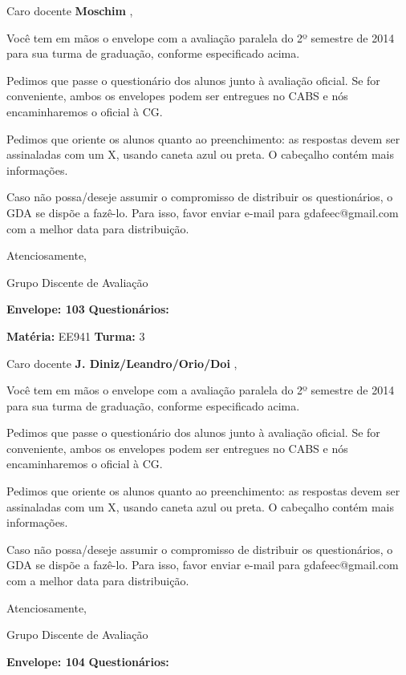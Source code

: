 \documentclass[a5paper]{letter}
\begin{document}
Caro docente {\bf Moschim }, 

	Você tem em mãos o envelope com a avaliação paralela do 2º semestre de 2014 para sua turma de graduação, conforme especificado acima.

	Pedimos que passe o questionário dos alunos junto à avaliação oficial. Se for conveniente, ambos os envelopes podem ser entregues no CABS e nós encaminharemos o oficial à CG.

Pedimos que oriente os alunos quanto ao preenchimento: as respostas devem ser assinaladas com um X, usando caneta azul ou preta. O cabeçalho contém mais informações.

	Caso não possa/deseje assumir o compromisso de distribuir os questionários, o GDA se dispõe a fazê-lo. Para isso, favor enviar e-mail para gdafeec@gmail.com com a melhor data para distribuição.


Atenciosamente, 

Grupo Discente de Avaliação

\vspace{0.5cm}

{\bf Envelope: 103 }		\hfill	{\bf Questionários:} \hspace{2cm}

\newpage
\thispagestyle{empty}

\hfill {\bf Matéria:} EE941 {\bf Turma:} 3

Caro docente {\bf J. Diniz/Leandro/Orio/Doi }, 

	Você tem em mãos o envelope com a avaliação paralela do 2º semestre de 2014 para sua turma de graduação, conforme especificado acima.

	Pedimos que passe o questionário dos alunos junto à avaliação oficial. Se for conveniente, ambos os envelopes podem ser entregues no CABS e nós encaminharemos o oficial à CG.

Pedimos que oriente os alunos quanto ao preenchimento: as respostas devem ser assinaladas com um X, usando caneta azul ou preta. O cabeçalho contém mais informações.

	Caso não possa/deseje assumir o compromisso de distribuir os questionários, o GDA se dispõe a fazê-lo. Para isso, favor enviar e-mail para gdafeec@gmail.com com a melhor data para distribuição.


Atenciosamente, 

Grupo Discente de Avaliação

\vspace{0.5cm}

{\bf Envelope: 104 }		\hfill	{\bf Questionários:} \hspace{2cm}

\newpage
\end{document}
